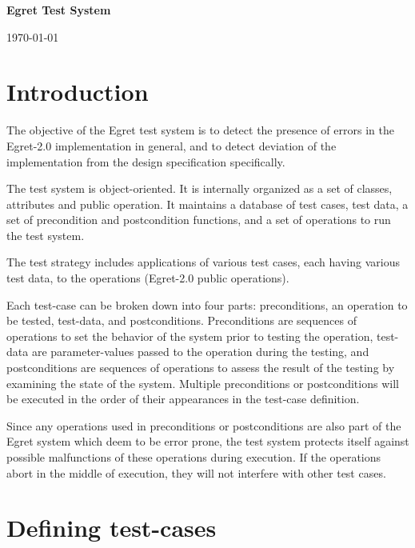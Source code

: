 

\begin {center}
{\large\bf Egret Test System}
  
\medskip 
\today 
\end {center} 


\section {Introduction}
The objective of the Egret test system is to detect the presence
of errors in the Egret-2.0 implementation in general, and to detect 
deviation of the implementation from the design specification specifically.

The test system is object-oriented.  It is internally organized as 
a set of classes, attributes and public operation.  It maintains
a database of test cases, test data, a set of precondition and
postcondition functions, and a set of operations to run the test system.

The test strategy includes applications of various test cases, each having
various test data, to the operations (Egret-2.0 public operations).

Each test-case  can be broken down into four parts: 
preconditions, an operation to be tested, test-data,
and postconditions.  Preconditions are sequences of operations
to set the behavior of the system prior to testing the operation, 
test-data are parameter-values passed to the operation during
the testing, and postconditions are sequences of operations 
to assess the result of the testing by examining the state of the 
system.  Multiple preconditions or postconditions  will be executed
in the order of their appearances in the test-case definition.

Since any operations used in preconditions or postconditions are
also part of the Egret system which deem to be error prone, the test
system protects itself against possible malfunctions of these operations
during execution. 
If the operations abort in the middle of execution, they will not
interfere with other test cases. 


\section {Defining test-cases}

